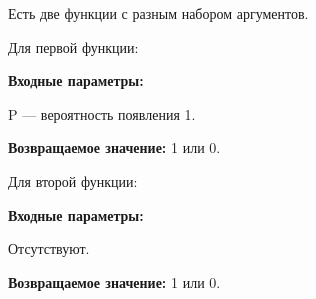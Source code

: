 Есть две функции с разным набором аргументов.

Для первой функции:

\textbf{Входные параметры:}

 P --- вероятность появления 1.

\textbf{Возвращаемое значение:}
1 или 0.

Для второй функции:

\textbf{Входные параметры:}

 Отсутствуют.

\textbf{Возвращаемое значение:}
1 или 0.
